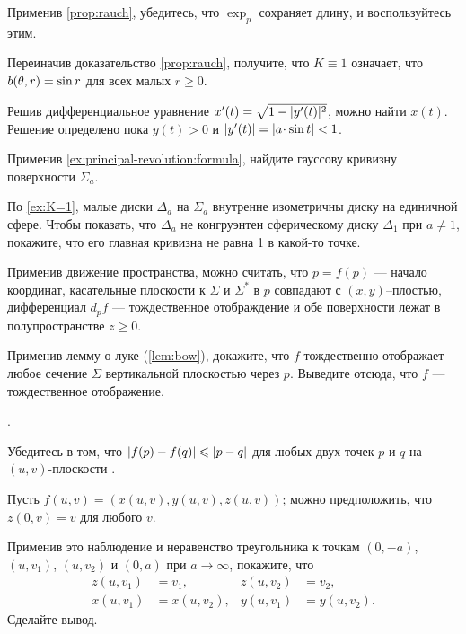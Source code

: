 \begin{multicols}{2}
Применив \ref{prop:rauch}, убедитесь, что $\exp_p$ сохраняет длину, и воспользуйтесь этим.

Переиначив доказательство \ref{prop:rauch}, получите, что $K\equiv 1$ означает, что $b(\theta,r)\z=\sin r$ для всех малых $r\ge 0$.

Решив дифференциальное уравнение $x'(t)\z=\sqrt{1-|y'(t)|^2}$, можно найти $x(t)$.
Решение определено пока $y(t)>0$ и $|y'(t)|\z=|a\cdot \sin t|<1$.

Применив \ref{ex:principal-revolution:formula}, найдите гауссову кривизну поверхности $\Sigma_a$.

По \ref{ex:K=1}, малые диски $\Delta_a$ на $\Sigma_a$ внутренне изометричны диску на единичной сфере.
Чтобы показать, что $\Delta_a$ не конгруэнтен сферическому диску $\Delta_1$ при $a\ne 1$, покажите, что его главная кривизна не равна 1 в какой-то точке.

Применив движение пространства,
можно считать, что $p=f(p)$ --- начало координат,
касательные плоскости к $\Sigma$ и $\Sigma^*$ в $p$ совпадают с $(x,y)$--плостью,
дифференциал $d_pf$ --- тождественное отображдение
и обе поверхности лежат в полупространстве $z\ge0$.

Применив лемму о луке (\ref{lem:bow}), докажите, что $f$ тождественно отображает любое сечение $\Sigma$ вертикальной плоскостью через $p$.
Выведите отсюда, что $f$ --- тождественное отображение.

 \cite[III § 6]{pogorelov}.

Убедитесь в том, что $|f(p)-f(q)|\z\le |p-q|$ для любых двух точек $p$ и $q$ на $(u,v)$-плоскости .

Пусть $f(u,v)=(x(u,v),y(u,v),z(u,v))$;
можно предположить, что $z(0,v)=v$ для любого $v$.

Применив это наблюдение и неравенство треугольника к точкам $(0,-a)$, $(u,v_1)$, $(u,v_2)$ и $(0,a)$ при $a\to \infty$, покажите, что 
\begin{align*}
z(u,v_1)&=v_1,
&
z(u,v_2)&=v_2,
\\
x(u,v_1)&=x(u,v_2),
&
y(u,v_1)&=y(u,v_2).
\end{align*}
Сделайте вывод.




\end{multicols}
